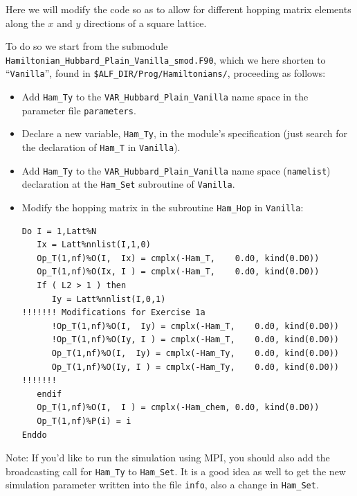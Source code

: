 \documentclass[10pt,modern]{scrartcl}
\numberwithin{exerciseitem}{exercise} %
\begin{document}



Here we will modify the code  so as to allow  for different hopping matrix elements along the $x$ and $y$ directions of a square lattice.

To do so we start from the submodule \texttt{Hamiltonian\_Hubbard\_Plain\_Vanilla\_smod.F90}, which we here shorten to ``\texttt{Vanilla}'', found in \texttt{\$ALF\_DIR/Prog/Hamiltonians/}, proceeding as follows: 
\begin{itemize}
	\item Add \texttt{Ham\_Ty} to the \texttt{VAR\_Hubbard\_Plain\_Vanilla} name space in the parameter file \texttt{parameters}.
	\item Declare a new variable, \texttt{Ham\_Ty}, in the module's specification (just search for the declaration of \texttt{Ham\_T} in \texttt{Vanilla}).
	\item Add \texttt{Ham\_Ty} to the \texttt{VAR\_Hubbard\_Plain\_Vanilla} name space (\texttt{namelist}) declaration at the \texttt{Ham\_Set} subroutine of \texttt{Vanilla}.
	\item Modify the hopping matrix in the subroutine \texttt{Ham\_Hop} in \texttt{Vanilla}:
\begin{lstlisting}[style=fortran]
Do I = 1,Latt%N
   Ix = Latt%nnlist(I,1,0)
   Op_T(1,nf)%O(I,  Ix) = cmplx(-Ham_T,    0.d0, kind(0.D0))
   Op_T(1,nf)%O(Ix, I ) = cmplx(-Ham_T,    0.d0, kind(0.D0))
   If ( L2 > 1 ) then
      Iy = Latt%nnlist(I,0,1)
!!!!!!! Modifications for Exercise 1a
      !Op_T(1,nf)%O(I,  Iy) = cmplx(-Ham_T,    0.d0, kind(0.D0))
      !Op_T(1,nf)%O(Iy, I ) = cmplx(-Ham_T,    0.d0, kind(0.D0))
      Op_T(1,nf)%O(I,  Iy) = cmplx(-Ham_Ty,    0.d0, kind(0.D0))
      Op_T(1,nf)%O(Iy, I ) = cmplx(-Ham_Ty,    0.d0, kind(0.D0))
!!!!!!!
   endif
   Op_T(1,nf)%O(I,  I ) = cmplx(-Ham_chem, 0.d0, kind(0.D0))
   Op_T(1,nf)%P(i) = i 
Enddo
\end{lstlisting} 
\end{itemize}
Note: If you'd like to run the simulation using MPI, you should also add the broadcasting call for \texttt{Ham\_Ty} to \texttt{Ham\_Set}. It is a good idea as well to get the new simulation parameter written into the file \texttt{info}, also a change in \texttt{Ham\_Set}.
\end{document}
